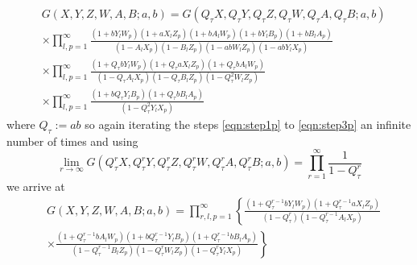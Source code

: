 \documentclass[main.tex]{subfiles}
\begin{document}
\begin{equation}\label{eqn:step3p}
\begin{aligned}
&G(X,Y,Z,W,A,B;a,b)=G\left(Q_{\tau}X,Q_{\tau}Y,Q_{\tau}Z,Q_{\tau}W,Q_{\tau}A,Q_{\tau}B;a,b\right)\\
&\times\prod_{l,p=1}^{\infty}\frac{\left(1+bY_lW_p\right)\left(1+aX_lZ_p\right)\left(1+bA_lW_p\right)\left(1+bY_lB_p\right)\left(1+bB_lA_p\right)}{\left(1-A_lX_p\right)\left(1-B_lZ_p\right)\left(1-abW_lZ_p\right)\left(1-abY_lX_p\right)}\\
&\times\prod_{l,p=1}^{\infty}\frac{\left(1+Q_{\tau}bY_lW_p\right)\left(1+Q_{\tau}aX_lZ_p\right)\left(1+Q_{\tau}bA_lW_p\right)}{\left(1-Q_{\tau}A_lX_p\right)\left(1-Q_{\tau}B_lZ_p\right)\left(1-Q_{\tau}^2W_lZ_p\right)}\\
&\times\prod_{l,p=1}^{\infty}\frac{\left(1+bQ_{\tau}Y_lB_p\right)\left(1+Q_{\tau}bB_lA_p\right)}{\left(1-Q_{\tau}^2Y_lX_p\right)}
\end{aligned}
\end{equation}
where $Q_{\tau}:=ab$ so again iterating the steps \eqref{eqn:step1p} to \eqref{eqn:step3p} an infinite number of times and using 
\begin{equation}
\lim_{r\to\infty}G\left(Q_{\tau}^rX,Q_{\tau}^rY,Q_{\tau}^rZ,Q_{\tau}^rW,Q_{\tau}^rA,Q_{\tau}^rB;a,b\right)=\prod_{r=1}^{\infty}\frac{1}{1-Q_{\tau}^r}
\end{equation}
we arrive at
\begin{equation}
\begin{aligned}
&G(X,Y,Z,W,A,B;a,b)=\prod_{r,l,p=1}^{\infty}\left\{\frac{\left(1+Q_{\tau}^{r-1}bY_lW_p\right)\left(1+Q_{\tau}^{r-1}aX_lZ_p\right)}{\left(1-Q_{\tau}^r\right)\left(1-Q_{\tau}^{r-1}A_lX_p\right)}\right.\\
&\left.\times\frac{\left(1+Q_{\tau}^{r-1}bA_lW_p\right)\left(1+bQ_{\tau}^{r-1}Y_lB_p\right)\left(1+Q_{\tau}^{r-1}bB_lA_p\right)}{\left(1-Q_{\tau}^{r-1}B_lZ_p\right)\left(1-Q_{\tau}^{r}W_lZ_p\right)\left(1-Q_{\tau}^{r}Y_lX_p\right)}\right\}
\end{aligned}
\end{equation}
\end{document}
